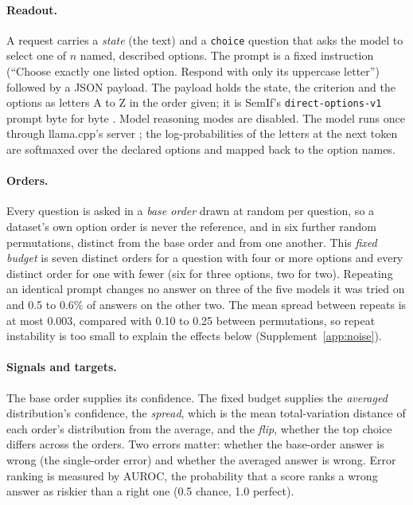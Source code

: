 \documentclass[10pt,twocolumn]{article}
\begin{document}
\paragraph{Readout.} A request carries a \emph{state} (the text) and a \texttt{choice} question that asks the model to select one of $n$ named, described options. The prompt is a fixed instruction (``Choose exactly one listed option. Respond with only its uppercase letter'') followed by a JSON payload. The payload holds the state, the criterion and the options as letters A to Z in the order given; it is SemIf's \texttt{direct-options-v1} prompt byte for byte \citep{semif2026}. Model reasoning modes are disabled. The model runs once through llama.cpp's server \citep{llamacpp}; the log-probabilities of the letters at the next token are softmaxed over the declared options and mapped back to the option names.

\paragraph{Orders.} Every question is asked in a \emph{base order} drawn at random per question, so a dataset's own option order is never the reference, and in six further random permutations, distinct from the base order and from one another. This \emph{fixed budget} is seven distinct orders for a question with four or more options and every distinct order for one with fewer (six for three options, two for two). Repeating an identical prompt changes no answer on three of the five models it was tried on and 0.5 to 0.6\% of answers on the other two. The mean spread between repeats is at most 0.003, compared with 0.10 to 0.25 between permutations, so repeat instability is too small to explain the effects below (Supplement~\ref{app:noise}).

\paragraph{Signals and targets.} The base order supplies its confidence. The fixed budget supplies the \emph{averaged} distribution's confidence, the \emph{spread}, which is the mean total-variation distance of each order's distribution from the average, and the \emph{flip}, whether the top choice differs across the orders. Two errors matter: whether the base-order answer is wrong (the single-order error) and whether the averaged answer is wrong. Error ranking is measured by AUROC, the probability that a score ranks a wrong answer as riskier than a right one (0.5 chance, 1.0 perfect).
\end{document}
